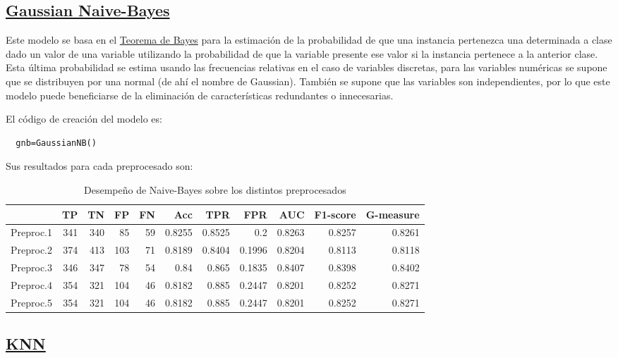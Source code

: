 \documentclass{article}
\begin{document}
\subsection{\href{https://scikit-learn.org/stable/modules/generated/sklearn.naive_bayes.GaussianNB.html}{Gaussian Naive-Bayes}}
Este modelo se basa en el
\href{https://en.wikipedia.org/wiki/Bayes%27_theorem}{Teorema de Bayes}
  para la estimación de la probabilidad de que una instancia
  pertenezca una determinada a clase dado un valor de una variable
  utilizando la probabilidad de que la variable presente ese valor si
  la instancia pertenece a la anterior clase. Esta última probabilidad
  se estima usando las frecuencias relativas en el caso de variables
  discretas, para las variables numéricas se supone que se distribuyen
  por una normal (de ahí el nombre de Gaussian). También se supone que
  las variables son independientes, por lo que este modelo puede
  beneficiarse de la eliminación de características redundantes o
  innecesarias.

El código de creación del modelo es:
\begin{lstlisting}
  gnb=GaussianNB()
\end{lstlisting}

Sus resultados para cada preprocesado son:

\begin{table}[H]
\centering
\caption{Desempeño de Naive-Bayes sobre los distintos preprocesados}
\label{tab:gnb}
\begin{tabular}{|lrrrrrrrrrr|}
\hline
 & TP & TN & FP & FN & Acc & TPR & FPR & AUC & F1-score & G-measure\\ \hline
  Preproc.1 & 341 & 340 & 85 & 59 & 0.8255 & 0.8525 & 0.2 & 0.8263 & 0.8257 & 0.8261\\
  Preproc.2 & 374 & 413 & 103 & 71 & 0.8189 & 0.8404 & 0.1996 & 0.8204 & 0.8113 & 0.8118\\
  Preproc.3 & 346 & 347 & 78 & 54 & 0.84 & 0.865 & 0.1835 & 0.8407 & 0.8398 & 0.8402\\
  Preproc.4 & 354 & 321 & 104 & 46 & 0.8182 & 0.885 & 0.2447 & 0.8201 & 0.8252 & 0.8271\\
  Preproc.5 & 354 & 321 & 104 & 46 & 0.8182 & 0.885 & 0.2447 & 0.8201 & 0.8252 & 0.8271\\
\hline
\end{tabular}
\end{table}

\subsection{\href{https://scikit-learn.org/stable/modules/generated/sklearn.neighbors.KNeighborsClassifier.html}{KNN}}
\end{document}
